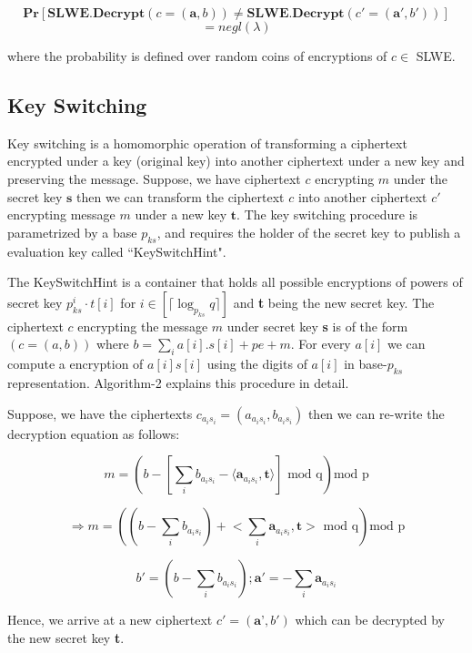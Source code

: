 \documentclass[10pt,journal,compsoc]{IEEEtran}
\theoremstyle{definition}
\begin{document}
$$\textbf{Pr}\left[ \textbf{SLWE.Decrypt} \left( c = \left(\textbf{a},b\right)\right)\neq \textbf{SLWE.Decrypt} \left( c' = \left(\textbf{a}',b'\right)\right) \right]$$
$$=negl(\lambda)$$

where the probability is defined over random coins of encryptions of $c \in$ SLWE.

\subsection{Key Switching}

Key switching is a homomorphic operation of transforming a ciphertext encrypted under a key (original  key) into another ciphertext under a new key and preserving the message. Suppose, we have ciphertext $c$ encrypting $m$ under the secret key $\textbf{s}$ then we can transform the ciphertext $c$ into another ciphertext $c'$ encrypting message $m$ under a new key $\textbf{t}$.  The key switching procedure is parametrized by a base $p_{ks}$, and requires the holder of the secret key to publish a evaluation key called ``KeySwitchHint".

The KeySwitchHint is a container that holds all possible encryptions of powers of secret key $p_{ks}^i\cdot t[i]$ for $i \in \left[\lceil \log_{p_{ks}} q \rceil \right]$ and \textbf{t} being the new secret key. The ciphertext $c$ encrypting the message $m$ under secret key \textbf{s} is of the form $\left( c = (a,b)\right)$ where $b = \sum_i a[i].s[i] + pe +m$. For every $a[i]$ we can compute a encryption of $a[i]s[i]$ using the digits of $a[i]$ in base-$p_{ks}$ representation. Algorithm-2 explains this procedure in detail. 

Suppose, we have the ciphertexts $c_{a_is_i} = \left( a_{a_is_i},b_{a_is_i}\right)$ then we can re-write the decryption equation as follows:

$$ m = \left(b - \left[\sum_i b_{a_is_i}-\langle \textbf{a}_{a_is_i},\textbf{t}\rangle\right] \textrm{ mod q}\right)\textrm{mod p}$$

$$\Rightarrow m = \left(\left(b - \sum_i b_{a_is_i}\right) + \biggl< \sum_i \textbf{a}_{a_is_i},\textbf{t} \biggr> \textrm{ mod q}\right)\textrm{mod p}$$

$$b' = \left(b - \sum_i b_{a_is_i}\right); \textbf{a}' = -\sum_i \textbf{a}_{a_is_i}$$

Hence, we arrive at a new ciphertext $c' = \left(\textbf{a'},b'\right)$ which can be decrypted by the new secret key \textbf{t}.
\end{document}
